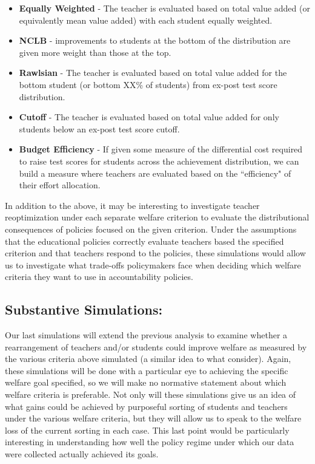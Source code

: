 \documentclass[letterpaper,12pt]{article}
\begin{document}
\begin{itemize}
    \item \textbf{Equally Weighted} - The teacher is evaluated based on total value added (or equivalently mean value added) with each student equally weighted.
    \item \textbf{NCLB} - improvements to students at the bottom of the distribution are given more weight than those at the top. 
    \item \textbf{Rawlsian} - The teacher is evaluated based on total value added for the bottom student (or bottom XX\% of students) from ex-post test score distribution. 
    \item \textbf{Cutoff} - The teacher is evaluated based on total value added for only students below an ex-post test score cutoff.
    \item \textbf{Budget Efficiency} - If given some measure of the differential cost required to raise test scores for students across the achievement distribution, we can build a measure where teachers are evaluated based on the ``efficiency" of their effort allocation.
\end{itemize}

In addition to the above, it may be interesting to investigate teacher reoptimization under each separate welfare criterion to evaluate the distributional consequences of policies focused on the given criterion. Under the assumptions that the educational policies correctly evaluate teachers based the specified criterion and that teachers respond to the policies, these simulations would allow us to investigate what trade-offs policymakers face when deciding which welfare criteria they want to use in accountability policies.


\subsection{Substantive Simulations:}

Our last simulations will extend the previous analysis to examine whether a rearrangement of teachers and/or students could improve welfare as measured by the various criteria above simulated (a similar idea to what \citet{condie2014teacher} consider). Again, these simulations will be done with a particular eye to achieving the specific welfare goal specified, so we will make no normative statement about which welfare criteria is preferable. Not only will these simulations give us an idea of what gains could be achieved by purposeful sorting of students and teachers under the various welfare criteria, but they will allow us to speak to the welfare loss of the current sorting in each case. This last point would be particularly interesting in understanding how well the policy regime under which our data were collected actually achieved its goals. 
\end{document}
